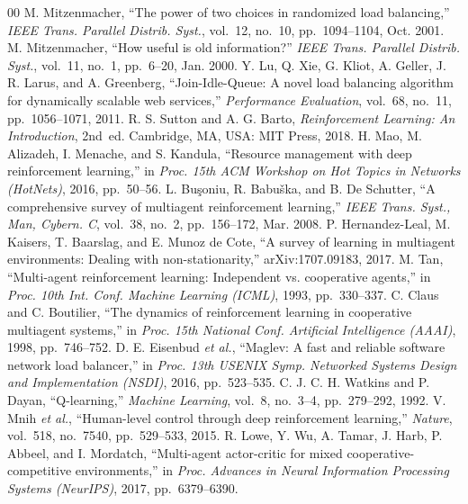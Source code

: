 \documentclass[conference]{IEEEtran}
\begin{document}
\begin{thebibliography}{00}
 M. Mitzenmacher, ``The power of two choices in randomized load balancing,'' \textit{IEEE Trans. Parallel Distrib. Syst.}, vol.~12, no.~10, pp.~1094--1104, Oct. 2001.
 M. Mitzenmacher, ``How useful is old information?'' \textit{IEEE Trans. Parallel Distrib. Syst.}, vol.~11, no.~1, pp.~6--20, Jan. 2000.
 Y. Lu, Q. Xie, G. Kliot, A. Geller, J. R. Larus, and A. Greenberg, ``Join-Idle-Queue: A novel load balancing algorithm for dynamically scalable web services,'' \textit{Performance Evaluation}, vol.~68, no.~11, pp.~1056--1071, 2011.
 R. S. Sutton and A. G. Barto, \textit{Reinforcement Learning: An Introduction}, 2nd~ed. Cambridge, MA, USA: MIT Press, 2018.
 H. Mao, M. Alizadeh, I. Menache, and S. Kandula, ``Resource management with deep reinforcement learning,'' in \textit{Proc. 15th ACM Workshop on Hot Topics in Networks (HotNets)}, 2016, pp.~50--56.
 L. Bu\c{s}oniu, R. Babu\v{s}ka, and B. De Schutter, ``A comprehensive survey of multiagent reinforcement learning,'' \textit{IEEE Trans. Syst., Man, Cybern. C}, vol.~38, no.~2, pp.~156--172, Mar. 2008.
 P. Hernandez-Leal, M. Kaisers, T. Baarslag, and E. Munoz de Cote, ``A survey of learning in multiagent environments: Dealing with non-stationarity,'' arXiv:1707.09183, 2017.
 M. Tan, ``Multi-agent reinforcement learning: Independent vs. cooperative agents,'' in \textit{Proc. 10th Int. Conf. Machine Learning (ICML)}, 1993, pp.~330--337.
 C. Claus and C. Boutilier, ``The dynamics of reinforcement learning in cooperative multiagent systems,'' in \textit{Proc. 15th National Conf. Artificial Intelligence (AAAI)}, 1998, pp.~746--752.
 D. E. Eisenbud \textit{et al.}, ``Maglev: A fast and reliable software network load balancer,'' in \textit{Proc. 13th USENIX Symp. Networked Systems Design and Implementation (NSDI)}, 2016, pp.~523--535.
 C. J. C. H. Watkins and P. Dayan, ``Q-learning,'' \textit{Machine Learning}, vol.~8, no.~3--4, pp.~279--292, 1992.
 V. Mnih \textit{et al.}, ``Human-level control through deep reinforcement learning,'' \textit{Nature}, vol.~518, no.~7540, pp.~529--533, 2015.
 R. Lowe, Y. Wu, A. Tamar, J. Harb, P. Abbeel, and I. Mordatch, ``Multi-agent actor-critic for mixed cooperative-competitive environments,'' in \textit{Proc. Advances in Neural Information Processing Systems (NeurIPS)}, 2017, pp.~6379--6390.
\end{thebibliography}
\end{document}
